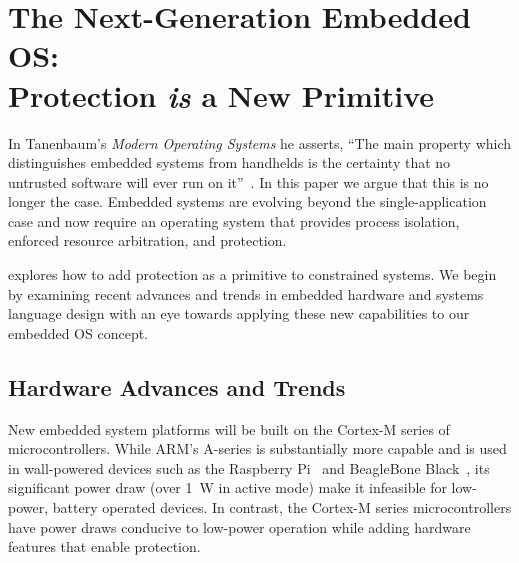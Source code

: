 \section{The Next-Generation Embedded OS:\\Protection \emph{is} a New Primitive}
\label{protection}

In Tanenbaum's \emph{Modern Operating Systems} he asserts, ``The main property
which distinguishes embedded systems from handhelds is the certainty that no
untrusted software will ever run on it''~\cite{tanenbaum}. In this paper we
argue that this is no longer the case.
Embedded systems
are evolving beyond the single-application case and now
require an operating system that provides process isolation, enforced resource
arbitration, and protection.

\name explores how to add protection as a primitive to constrained
systems.
We begin by examining recent advances and trends in embedded
hardware and systems language design with an eye towards applying these
new capabilities to our embedded OS concept.


%
%

\subsection{Hardware Advances and Trends}

New embedded system platforms will be built on the Cortex-M series of microcontrollers.
While ARM's A-series is substantially more capable and is used in wall-powered
devices such as the Raspberry Pi~\cite{rpi} and BeagleBone Black~\cite{bbb},
its significant power draw (over 1~W in active mode) make it infeasible for
low-power, battery operated devices.
In contrast, the Cortex-M series microcontrollers have power draws conducive
to low-power operation while adding hardware features that enable protection.


